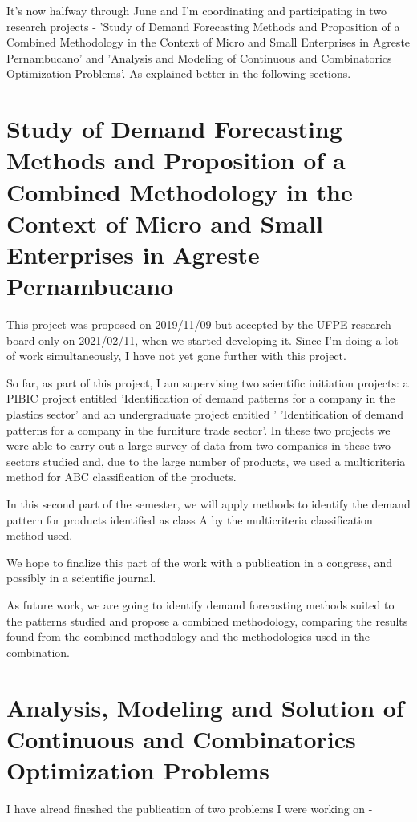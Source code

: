 \documentclass[11pt,latterpaper,twocolumn]{article}
\begin{document}
It's now halfway through June and I'm coordinating and participating in two research projects - 'Study of Demand Forecasting Methods and Proposition of a Combined Methodology in the Context of Micro and Small Enterprises in Agreste Pernambucano' and 'Analysis and Modeling of Continuous and Combinatorics Optimization Problems'. As explained better in the following sections.

\section{Study of Demand Forecasting Methods and Proposition of a Combined Methodology in the Context of Micro and Small Enterprises in Agreste Pernambucano}

This project was proposed on 2019/11/09 but accepted by the UFPE research board only on 2021/02/11, when we started developing it. Since I'm doing a lot of work simultaneously, I have not yet gone further with this project.

So far, as part of this project, I am supervising two scientific initiation projects: a PIBIC project entitled 'Identification of demand patterns for a company in the plastics sector' and an undergraduate project entitled ' 'Identification of demand patterns for a company in the furniture trade sector'. In these two projects we were able to carry out a large survey of data from two companies in these two sectors studied and, due to the large number of products, we used a multicriteria method for ABC classification of the products.

In this second part of the semester, we will apply methods to identify the demand pattern for products identified as class A by the multicriteria classification method used.

We hope to finalize this part of the work with a publication in a congress, and possibly in a scientific journal.

As future work, we are going to identify demand forecasting methods suited to the patterns studied and propose a combined methodology, comparing the results found from the combined methodology and the methodologies used in the combination.

\section{Analysis, Modeling and Solution of Continuous and Combinatorics Optimization Problems}

I have alread fineshed the publication of two problems I were working on - 
\end{document}
